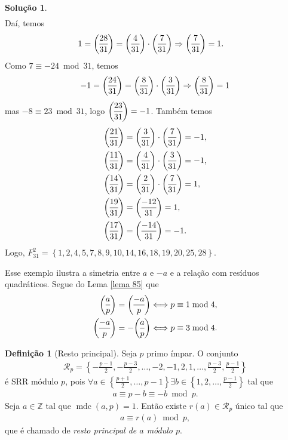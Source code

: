 \documentclass[a4paper,11pt,twoside, leqno]{article}
\DeclareMathOperator{\mdc}{mdc}
\newcommand{\genlegendre}[4]{%
	\genfrac{(}{)}{}{#1}{#3}{#4}%
	\if\relax\detokenize{#2}\relax\else_{\!#2}\fi
}
\newcommand{\legendre}[3][]{\genlegendre{}{#1}{#2}{#3}}
\theoremstyle{definition}
\newtheorem*{definition}{Definição}
\newtheorem*{solution}{Solução}
\begin{document}
\begin{solution}
\begin{align*}
	\end{align*}
	Daí, temos
	\begin{align*}
	1 &= \legendre[]{28}{31} = \legendre[]{4}{31}\cdot\legendre[]{7}{31} \Rightarrow \legendre[]{7}{31} = 1.
	\end{align*} 
	Como $7\equiv -24\bmod 31$, temos
	\begin{align*}
	-1 &= \legendre[]{24}{31} = \legendre[]{8}{31}\cdot\legendre[]{3}{31} \Rightarrow \legendre[]{8}{31} = 1 \\
	\end{align*}
	mas $-8\equiv 23\bmod 31$, logo $\displaystyle{\legendre[]{23}{31} = -1}$. Também temos
	\begin{align*}
	&\legendre[]{21}{31} = \legendre[]{3}{31}\cdot\legendre[]{7}{31} = -1, \\
	&\legendre[]{11}{31} = \legendre[]{4}{31}\cdot\legendre[]{3}{31} = -1, \\
	&\legendre[]{14}{31} = \legendre[]{2}{31}\cdot\legendre[]{7}{31} = 1, \\
	&\legendre[]{19}{31} = \legendre[]{-12}{31} = 1, \\
	&\legendre[]{17}{31} = \legendre[]{-14}{31} = -1.
	\end{align*}
	Logo, $F_{31}^2 = \left\{ 1,2,4,5,7,8,9,10,14,16,18,19,20,25,28 \right\}$.
\end{solution}
\hspace{12pt} Esse exemplo ilustra a simetria entre $a$ e $-a$ e a relação com resíduos quadráticos. Segue do Lema \eqref{lema 85} que
\begin{align*}
\legendre[]{a}{p} = \legendre[]{-a}{p}\Longleftrightarrow p\equiv 1\bmod 4, \\
\legendre[]{-a}{p} = -\legendre[]{a}{p}\Longleftrightarrow p\equiv 3\bmod 4.
\end{align*}
\begin{definition}[Resto principal]
	Seja $p$ primo ímpar. O conjunto
	\begin{align*}
	\mathcal{R}_p = \left\{ -\frac{p-1}{2}, -\frac{p-3}{2}, \dots, -2,-1,2,1,\dots, \frac{p-3}{2}, \frac{p-1}{2} \right\}
	\end{align*}
	é SRR módulo $p$, pois $\displaystyle{\forall a\in\left\{ \frac{p+1}{2}, \dots, p-1 \right\}\exists b\in\left\{ 1,2,\dots,\frac{p-1}{2} \right\} }$ tal que 
	\begin{align*}
	a\equiv p-b\equiv -b\bmod p.
	\end{align*}
	Seja $a\in\mathbb{Z}$ tal que $\mdc(a,p) = 1$. Então existe $r(a)\in \mathcal{R}_p$ único tal que
	\begin{align*}
	a\equiv r(a)\bmod p,
	\end{align*}
	que é chamado de {\em resto principal de $a$ módulo $p$}.
\end{definition}
\end{document}
